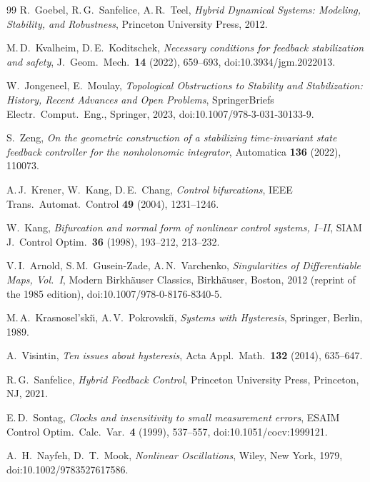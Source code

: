 \documentclass[11pt,reqno]{amsart}
\theoremstyle{plain}
\theoremstyle{definition}
\theoremstyle{remark}
\begin{document}
\begin{thebibliography}{99}
 R.~Goebel, R.\,G.~Sanfelice, A.\,R.~Teel,
  \emph{Hybrid Dynamical Systems: Modeling, Stability, and Robustness}, Princeton University Press, 2012.

 M.\,D.~Kvalheim, D.\,E.~Koditschek,
  \emph{Necessary conditions for feedback stabilization and safety}, J.\ Geom.\ Mech.\ \textbf{14} (2022),
  659--693, doi:10.3934/jgm.2022013.

 W.~Jongeneel, E.~Moulay,
  \emph{Topological Obstructions to Stability and Stabilization: History, Recent Advances and Open Problems},
  SpringerBriefs Electr.\ Comput.\ Eng., Springer, 2023, doi:10.1007/978-3-031-30133-9.

 S.~Zeng,
  \emph{On the geometric construction of a stabilizing time-invariant state feedback controller
  for the nonholonomic integrator},
  Automatica \textbf{136} (2022), 110073.

 A.\,J.~Krener, W.~Kang, D.\,E.~Chang,
  \emph{Control bifurcations},
  IEEE Trans.\ Automat.\ Control \textbf{49} (2004), 1231--1246.

 W.~Kang,
  \emph{Bifurcation and normal form of nonlinear control systems, I--II},
  SIAM J.\ Control Optim.\ \textbf{36} (1998), 193--212, 213--232.

 V.\,I.~Arnold, S.\,M.~Gusein-Zade, A.\,N.~Varchenko,
  \emph{Singularities of Differentiable Maps, Vol.~I}, Modern Birkh\"auser Classics,
  Birkh\"auser, Boston, 2012 (reprint of the 1985 edition), doi:10.1007/978-0-8176-8340-5.

 M.\,A.~Krasnosel'ski\u{\i}, A.\,V.~Pokrovski\u{\i},
  \emph{Systems with Hysteresis}, Springer, Berlin, 1989.

 A.~Visintin, \emph{Ten issues about hysteresis}, Acta Appl.\ Math.\
  \textbf{132} (2014), 635--647.

 R.\,G.~Sanfelice,
  \emph{Hybrid Feedback Control}, Princeton University Press, Princeton, NJ, 2021.

 E.\,D.~Sontag,
  \emph{Clocks and insensitivity to small measurement errors}, ESAIM Control Optim.\ Calc.\ Var.\
  \textbf{4} (1999), 537--557, doi:10.1051/cocv:1999121.

 A.~H.~Nayfeh, D.~T.~Mook, \emph{Nonlinear Oscillations}, Wiley, New York, 1979, doi:10.1002/9783527617586.


\end{thebibliography}
\end{document}
